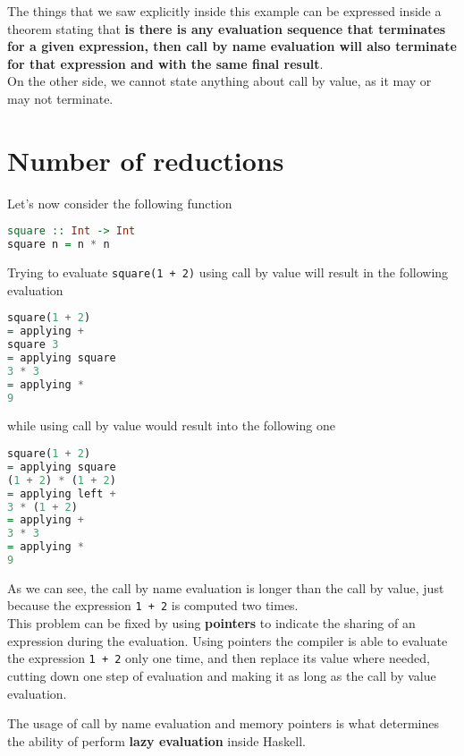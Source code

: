 The things that we saw explicitly inside this example can be expressed inside a theorem stating that \textbf{is there is any evaluation sequence that terminates for a given expression, then call by name evaluation will also terminate for that expression and with the same final result}. \\
On the other side, we cannot state anything about call by value, as it may or may not terminate.

\section{Number of reductions}
Let's now consider the following function

\begin{lstlisting}[language=haskell]
square :: Int -> Int
square n = n * n
\end{lstlisting}

Trying to evaluate \texttt{square(1 + 2)} using call by value will result in the following evaluation

\begin{lstlisting}[language=haskell]
square(1 + 2)
= applying +
square 3
= applying square
3 * 3
= applying *
9 
\end{lstlisting}

while using call by value would result into the following one

\begin{lstlisting}[language=haskell]
square(1 + 2)
= applying square
(1 + 2) * (1 + 2)
= applying left +
3 * (1 + 2)
= applying +
3 * 3
= applying *
9
\end{lstlisting}

As we can see, the call by name evaluation is longer than the call by value, just because the expression \texttt{1 + 2} is computed two times. \\
This problem can be fixed by using \textbf{pointers} to indicate the sharing of an expression during the evaluation. Using pointers the compiler is able to evaluate the expression \texttt{1 + 2} only one time, and then replace its value where needed, cutting down one step of evaluation and making it as long as the call by value evaluation.
\linebreak \linebreak

The usage of call by name evaluation and memory pointers is what determines the ability of perform \textbf{lazy evaluation} inside Haskell. 
\linebreak \linebreak

